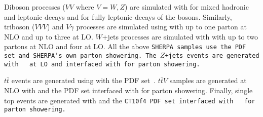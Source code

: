 Diboson processes ($VV$ where $V = W,Z$) are simulated with  for mixed hadronic and leptonic decays and  for fully leptonic decays of the bosons.
Similarly, triboson ($VVV$) and $V\gamma$ processes are simulated using  with up to one parton at NLO and up to three at LO.
$W$+jets processes are simulated with  with up to two partons at NLO and four at LO.
All the above \tt{SHERPA} samples use the \nnpdf PDF set and \tt{SHERPA}'s own parton showering.
The $Z$+jets events are generated with \mcatnlo~\cite{2014.madgraph_mcnlo} at LO and interfaced with  for parton showering.

$t\bar{t}$ events are generated using  with the \ctten PDF set~\cite{2010.ct10}.
$t\bar{t}V$ samples are generated at NLO with \mcatnlo and the \nnpdf PDF set interfaced with  for parton showering.
Finally, single top events are generated with  and the \tt{CT10f4} PDF set interfaced with ~\cite{2006.Pythia6} for parton showering.

\begin{table}
  \centering
  \caption{Summary of MC samples used in the analysis.}
  \label{tab:ssww13tev_mcsamples}
\end{table}
